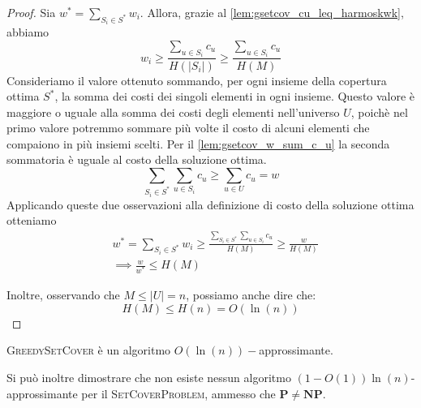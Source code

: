\begin{proof}
	Sia $w^* = \sum_{S_i \in S^*} w_i$.
	Allora, grazie al \cref{lem:gsetcov_cu_leq_harmoskwk}, abbiamo
	$$
		w_i \geq \frac{\sum_{u \in S_i} c_u}{H(|S_i|)} \geq \frac{\sum_{u \in S_i} c_u}{H(M)}
	$$
	Consideriamo il valore ottenuto sommando, per ogni insieme della copertura ottima $S^*$, la somma
	dei costi dei singoli elementi in ogni insieme. Questo valore è maggiore o uguale alla somma
	dei costi degli elementi nell'universo $U$, poichè nel primo valore potremmo sommare più volte
	il costo di alcuni elementi che compaiono in più insiemi scelti.
	Per il \cref{lem:gsetcov_w_sum_c_u} la seconda sommatoria è uguale al costo della soluzione ottima.
	$$
		\sum_{S_i \in S^*}\sum_{u \in S_i} c_u \geq \sum_{u \in U} c_u = w
	$$
	Applicando queste due osservazioni alla definizione di costo della soluzione ottima otteniamo
	\begin{align}
		 & w^* = \sum_{S_i \in S^*} w_i \geq \frac{\sum_{S_i \in S^*} \sum_{u \in S_i} c_u}{H(M)} \geq \frac{w}{H(M)} \\
		 & \implies \frac{w}{w^*} \leq H(M)
	\end{align}

	Inoltre, osservando che $M \leq |U| = n$, possiamo anche dire che:
	$$
		H(M) \leq H(n) = O(\ln(n))
	$$
\end{proof}
\begin{corollario}
	\textsc{GreedySetCover} è un algoritmo $O(\ln(n))-$approssimante.
\end{corollario}
Si può inoltre dimostrare che non esiste nessun algoritmo
$(1 - O(1))\ln(n)$-approssimante per il \textsc{SetCoverProblem},
ammesso che $\mathbf{P} \neq \mathbf{NP}$.

